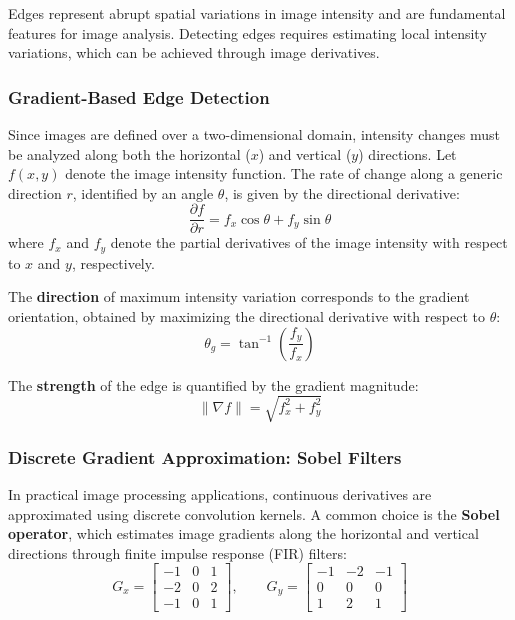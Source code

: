 Edges represent abrupt spatial variations in image intensity and are fundamental features for image analysis. Detecting edges requires estimating local intensity variations, which can be achieved through image derivatives.

\subsubsection*{Gradient-Based Edge Detection}
Since images are defined over a two-dimensional domain, intensity changes must be analyzed along both the horizontal ($x$) and vertical ($y$) directions. Let $f(x,y)$ denote the image intensity function. The rate of change along a generic direction $r$, identified by an angle $\theta$, is given by the directional derivative:
\begin{equation}
    \frac{\partial f}{\partial r}
    =
    f_x \cos\theta + f_y \sin\theta
\end{equation}
where $f_x$ and $f_y$ denote the partial derivatives of the image intensity with respect to $x$ and $y$, respectively.

The \textbf{direction} of maximum intensity variation corresponds to the gradient orientation, obtained by maximizing the directional derivative with respect to $\theta$:
\begin{equation}
    \theta_g
    =
    \tan^{-1}\left(\frac{f_y}{f_x}\right)
\end{equation}

The \textbf{strength} of the edge is quantified by the gradient magnitude:
\begin{equation}
    \|\nabla f\|
    =
    \sqrt{f_x^2 + f_y^2}
\end{equation}

\subsubsection*{Discrete Gradient Approximation: Sobel Filters}
In practical image processing applications, continuous derivatives are approximated using discrete convolution kernels. 
A common choice is the \textbf{Sobel operator}, which estimates image gradients along the horizontal and vertical directions through finite impulse response (FIR) filters:
\begin{equation}
    G_x =
    \begin{bmatrix}
    -1 & 0 & 1 \\
    -2 & 0 & 2 \\
    -1 & 0 & 1
    \end{bmatrix},
    \qquad
    G_y =
    \begin{bmatrix}
    -1 & -2 & -1 \\
    0 & 0 & 0 \\
    1 & 2 & 1
    \end{bmatrix}
\end{equation}

